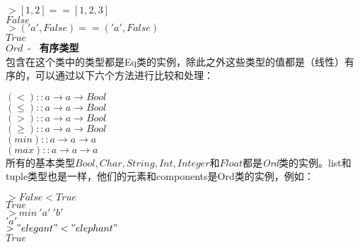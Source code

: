 \noindent\hspace*{1cm} $> [1, 2] == [1, 2, 3]$\\
\hspace*{1cm} $False$\\

\noindent\hspace*{1cm} $> ('a', False) == ('a', False)$\\
\hspace*{1cm} $True$\\

\noindent$Ord$~-~ \textbf{有序类型}\\
包含在这个类中的类型都是Eq类的实例，除此之外这些类型的值都是（线性）有序的，可以通过以下六个方法进行比较和处理：

\noindent\hspace*{1cm} $(<) :: a \rightarrow a \rightarrow Bool$\\
\hspace*{1cm} $(\leq) :: a \rightarrow a \rightarrow Bool$\\
\hspace*{1cm} $(>) :: a \rightarrow a \rightarrow Bool$\\
\hspace*{1cm} $(\geq) :: a \rightarrow a \rightarrow Bool$\\
\hspace*{1cm} $(min) :: a \rightarrow a \rightarrow a$\\
\hspace*{1cm} $(max) :: a \rightarrow a \rightarrow a$\\

所有的基本类型$Bool, Char, String, Int,
Integer$和$Float$都是\textit{Ord}类的实例。list和tuple类型也是一样，他们的元素和components是Ord类的实例，例如：

\noindent\hspace*{1cm} $> False < True$\\
\hspace*{1cm} $True$\\

\noindent\hspace*{1cm} $> min~'a'~'b'$\\
\hspace*{1cm} $'a'$\\

\noindent\hspace*{1cm} $> "elegant" < "elephant"$\\
\hspace*{1cm} $True$\\

